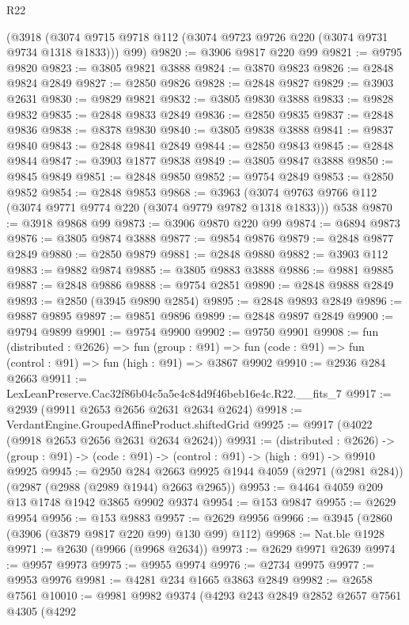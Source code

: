 \begin{lexlean}{R22}
\begin{coremodule}
    (@3918 (@3074 @9715 @9718 @112 (@3074 @9723 @9726 @220 (@3074 @9731 @9734 @1318 @1833))) @99)
@9820 := @3906 @9817 @220 @99
@9821 := @9795 @9820
@9823 := @3805 @9821 @3888
@9824 := @3870 @9823
@9826 := @2848 @9824 @2849
@9827 := @2850 @9826
@9828 := @2848 @9827
@9829 := @3903 @2631
@9830 := @9829 @9821
@9832 := @3805 @9830 @3888
@9833 := @9828 @9832
@9835 := @2848 @9833 @2849
@9836 := @2850 @9835
@9837 := @2848 @9836
@9838 := @8378 @9830
@9840 := @3805 @9838 @3888
@9841 := @9837 @9840
@9843 := @2848 @9841 @2849
@9844 := @2850 @9843
@9845 := @2848 @9844
@9847 := @3903 @1877 @9838
@9849 := @3805 @9847 @3888
@9850 := @9845 @9849
@9851 := @2848 @9850
@9852 := @9754 @2849
@9853 := @2850 @9852
@9854 := @2848 @9853
@9868 := @3963
    (@3074 @9763 @9766 @112 (@3074 @9771 @9774 @220 (@3074 @9779 @9782 @1318 @1833)))
    @538
@9870 := @3918 @9868 @99
@9873 := @3906 @9870 @220 @99
@9874 := @6894 @9873
@9876 := @3805 @9874 @3888
@9877 := @9854 @9876
@9879 := @2848 @9877 @2849
@9880 := @2850 @9879
@9881 := @2848 @9880
@9882 := @3903 @112
@9883 := @9882 @9874
@9885 := @3805 @9883 @3888
@9886 := @9881 @9885
@9887 := @2848 @9886
@9888 := @9754 @2851
@9890 := @2848 @9888 @2849
@9893 := @2850 (@3945 @9890 @2854)
@9895 := @2848 @9893 @2849
@9896 := @9887 @9895
@9897 := @9851 @9896
@9899 := @2848 @9897 @2849
@9900 := @9794 @9899
@9901 := @9754 @9900
@9902 := @9750 @9901
@9908 := fun (distributed : @2626) =>
  fun (group : @91) => fun (code : @91) => fun (control : @91) => fun (high : @91) => @3867 @9902
@9910 := @2936 @284 @2663
@9911 := LexLeanPreserve.Cac32f86b04c5a5e4c84d9f46beb16e4c.R22.__fits_7
@9917 := @2939 (@9911 @2653 @2656 @2631 @2634 @2624)
@9918 := VerdantEngine.GroupedAffineProduct.shiftedGrid
@9925 := @9917 (@4022 (@9918 @2653 @2656 @2631 @2634 @2624))
@9931 := (distributed : @2626) ->
  (group : @91) -> (code : @91) -> (control : @91) -> (high : @91) -> @9910 @9925
@9945 := @2950
    @284
    @2663
    @9925
    @1944
    @4059
    (@2971 (@2981 @284))
    (@2987 (@2988 (@2989 @1944) @2663 @2965))
@9953 := @4464 @4059 @209 @13 @1748 @1942 @3865 @9902 @9374
@9954 := @153 @9847
@9955 := @2629 @9954
@9956 := @153 @9883
@9957 := @2629 @9956
@9966 := @3945 (@2860 (@3906 (@3879 @9817 @220 @99) @130 @99) @112)
@9968 := Nat.ble @1928
@9971 := @2630 (@9966 (@9968 @2634))
@9973 := @2629 @9971 @2639
@9974 := @9957 @9973
@9975 := @9955 @9974
@9976 := @2734 @9975
@9977 := @9953 @9976
@9981 := @4281 @234 @1665 @3863 @2849
@9982 := @2658 @7561
@10010 := @9981
    @9982
    @9374
    (@4293
      @243
      @2849
      @2852
      @2657
      @7561
      @4305
      (@4292

\end{coremodule}
\end{lexlean}
